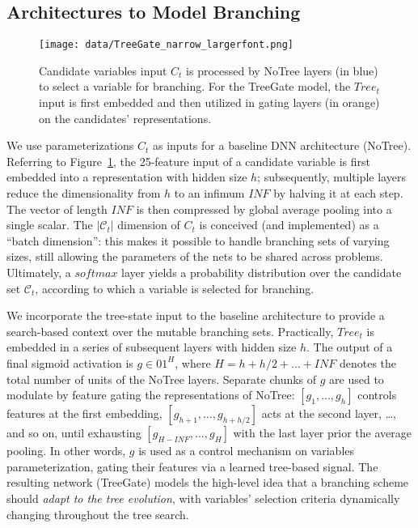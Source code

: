 \documentclass[letterpaper]{article} %
\begin{document}
\subsection{Architectures to Model Branching}
\label{subsec:architecture}

\begin{figure}[!t]
    \centering
    \texttt{[image: data/TreeGate\_narrow\_largerfont.png]} %
    \caption{Candidate variables input $C_t$ is processed by NoTree layers (in blue) to select a variable for branching. For the TreeGate model, the $\mathit{Tree}_t$ input is first embedded and then utilized in gating layers (in orange) on the candidates' representations.}
    \label{fig:treegate}
\end{figure}

We use parameterizations $C_t$ as inputs for a baseline DNN architecture (NoTree).
Referring to Figure~\ref{fig:treegate}, the 25-feature input of a candidate variable is first embedded into a representation with hidden size $h$; subsequently, multiple layers reduce the dimensionality from $h$ to an infimum $\mathit{INF}$ by halving it at each step.
The vector of length $\mathit{INF}$ is then compressed by global average pooling into a single scalar.
The $|\mathcal{C}_t|$ dimension of $C_t$ is conceived (and implemented) as a ``batch dimension'': this makes it possible to handle branching sets of varying sizes, still allowing the parameters of the nets to be shared across problems.
Ultimately, a $\mathit{softmax}$ layer yields a probability distribution over the candidate set $\mathcal{C}_t$, according to which a variable is selected for branching.

We incorporate the tree-state input to the baseline architecture to provide a search-based context over the mutable branching sets.
Practically, $\mathit{Tree}_t$ is embedded in a series of subsequent layers with hidden size $h$.
The output of a final sigmoid activation is $g\in01^{H}$, where $H=h+h/2+\dots+\mathit{INF}$ denotes the total number of units of the NoTree layers.
Separate chunks of $g$ are used to modulate by feature gating the representations of NoTree: $[g_1, \dots, g_h]$ controls features at the first embedding, $[g_{h+1}, \dots, g_{h+h/2}]$ acts at the second layer, \dots, and so on, until exhausting $[g_{H-\mathit{INF}}, \dots, g_H]$ with the last layer prior the average pooling.
In other words, $g$ is used as a control mechanism on variables parameterization, gating their features via a learned tree-based signal.
The resulting network (TreeGate) models the high-level idea that a branching scheme should \emph{adapt to the tree evolution}, with variables' selection criteria dynamically changing throughout the tree search.
\end{document}
